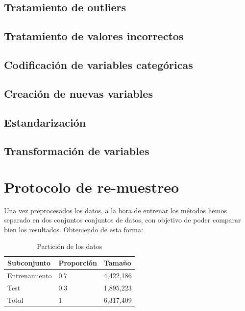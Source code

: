 \documentclass[a4paper]{article}
\begin{document}
\subsection{Tratamiento de outliers}

\subsection{Tratamiento de valores incorrectos}

\subsection{Codificación de variables categóricas}


\subsection{Creación de nuevas variables}

\subsection{Estandarización}

\subsection{Transformación de variables}

\section{Protocolo de re-muestreo}

Una vez preprocesados los datos, a la hora de entrenar los métodos hemos separado en dos conjuntos conjuntos de datos, 
con objetivo de poder comparar bien los resultados. Obteniendo de esta forma: 

\begin{table}[H]
\centering
\caption{Partición de los datos}
\label{my-label}
\begin{tabular}{|l|l|l|}
\hline
\textbf{Subconjunto}              & \textbf{Proporción}   & \textbf{Tamaño}    \\ \hline
Entrenamiento                     & 0.7                   & 4,422,186   \\ \hline
Test                              & 0.3                   & 1,895,223   \\ \hline
Total                             & 1                     & 6,317,409   \\ \hline
\end{tabular}
\end{table}
\end{document}
